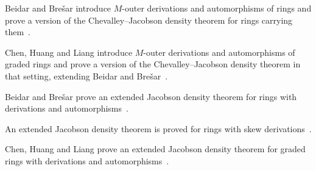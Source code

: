 Beidar and Bre\v{s}ar introduce $M$-outer derivations and automorphisms of rings and prove a version of the Chevalley--Jacobson density theorem for rings carrying them~\cite{WlExtendedJacobsonDensityTheorem2001}.

Chen, Huang and Liang introduce $M$-outer derivations and automorphisms of graded rings and prove a version of the Chevalley--Jacobson density theorem in that setting, extending Beidar and Bre\v{s}ar~\cite{WlExtendedJacobsonDensityTheorem2010}.

Beidar and Bre\v{s}ar prove an extended Jacobson density theorem for rings with derivations and automorphisms~\cite{WlExtendedJacobsonDensityTheorem2020}.

An extended Jacobson density theorem is proved for rings with skew derivations~\cite{WlExtendedJacobsonDensityTheorem2020}.

Chen, Huang and Liang prove an extended Jacobson density theorem for graded rings with derivations and automorphisms~\cite{WlExtendedJacobsonDensityTheorem2020}.
